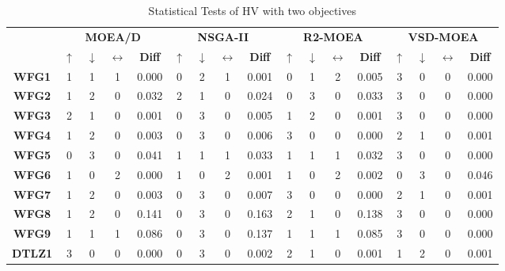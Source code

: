 \begin{table*}[t]
\caption{Statistical Tests of HV with two objectives}
\label{tab:Tests_HV_2obj}
\centering
\begin{tabular}{c|c|c|c|c|c|c|c|c|c|c|c|c|c|c|c|c|}
\cline{2-17}
\textbf{} & \multicolumn{4}{c|}{\textbf{MOEA/D}} & \multicolumn{4}{c|}{\textbf{NSGA-II}} & \multicolumn{4}{c|}{\textbf{R2-MOEA}} & \multicolumn{4}{c|}{\textbf{VSD-MOEA}} \\ \cline{2-17} 
 & \textbf{$\uparrow$} & \textbf{$\downarrow$} & \textbf{$\leftrightarrow$} & \textbf{Diff} & \textbf{$\uparrow$} & \textbf{$\downarrow$} & \textbf{$\leftrightarrow$} & \textbf{Diff} & \textbf{$\uparrow$} & \textbf{$\downarrow$} & \textbf{$\leftrightarrow$} & \textbf{Diff} & \textbf{$\uparrow$} & \textbf{$\downarrow$} & \textbf{$\leftrightarrow$} & \textbf{Diff} \\ \hline
\multicolumn{1}{|c|}{\textbf{WFG1}} & 1 & 1 & 1 & 0.000 & 0 & 2 & 1 & 0.001 & 0 & 1 & 2 & 0.005 & 3 & 0 & 0 & 0.000 \\ \hline
\multicolumn{1}{|c|}{\textbf{WFG2}} & 1 & 2 & 0 & 0.032 & 2 & 1 & 0 & 0.024 & 0 & 3 & 0 & 0.033 & 3 & 0 & 0 & 0.000 \\ \hline
\multicolumn{1}{|c|}{\textbf{WFG3}} & 2 & 1 & 0 & 0.001 & 0 & 3 & 0 & 0.005 & 1 & 2 & 0 & 0.001 & 3 & 0 & 0 & 0.000 \\ \hline
\multicolumn{1}{|c|}{\textbf{WFG4}} & 1 & 2 & 0 & 0.003 & 0 & 3 & 0 & 0.006 & 3 & 0 & 0 & 0.000 & 2 & 1 & 0 & 0.001 \\ \hline
\multicolumn{1}{|c|}{\textbf{WFG5}} & 0 & 3 & 0 & 0.041 & 1 & 1 & 1 & 0.033 & 1 & 1 & 1 & 0.032 & 3 & 0 & 0 & 0.000 \\ \hline
\multicolumn{1}{|c|}{\textbf{WFG6}} & 1 & 0 & 2 & 0.000 & 1 & 0 & 2 & 0.001 & 1 & 0 & 2 & 0.002 & 0 & 3 & 0 & 0.046 \\ \hline
\multicolumn{1}{|c|}{\textbf{WFG7}} & 1 & 2 & 0 & 0.003 & 0 & 3 & 0 & 0.007 & 3 & 0 & 0 & 0.000 & 2 & 1 & 0 & 0.001 \\ \hline
\multicolumn{1}{|c|}{\textbf{WFG8}} & 1 & 2 & 0 & 0.141 & 0 & 3 & 0 & 0.163 & 2 & 1 & 0 & 0.138 & 3 & 0 & 0 & 0.000 \\ \hline
\multicolumn{1}{|c|}{\textbf{WFG9}} & 1 & 1 & 1 & 0.086 & 0 & 3 & 0 & 0.137 & 1 & 1 & 1 & 0.085 & 3 & 0 & 0 & 0.000 \\ \hline
\multicolumn{1}{|c|}{\textbf{DTLZ1}} & 3 & 0 & 0 & 0.000 & 0 & 3 & 0 & 0.002 & 2 & 1 & 0 & 0.001 & 1 & 2 & 0 & 0.001 \\ \hline

\end{tabular}
\end{table*}

